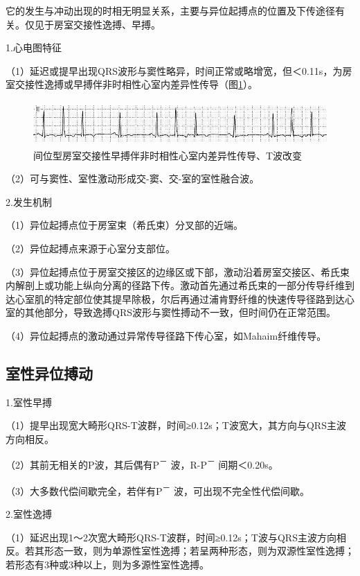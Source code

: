 它的发生与冲动出现的时相无明显关系，主要与异位起搏点的位置及下传途径有关。仅见于房室交接性逸搏、早搏。

1.心电图特征

（1）延迟或提早出现QRS波形与窦性略异，时间正常或略增宽，但＜0.11s，为房室交接性逸搏或早搏伴非时相性心室内差异性传导（图\ref{fig3-16}）。

\begin{figure}[!htbp]
 \centering
 \includegraphics[width=5.58333in,height=0.66667in]{./images/Image00066.jpg}
 \captionsetup{justification=centering}
 \caption{间位型房室交接性早搏伴非时相性心室内差异性传导、T波改变}
 \label{fig3-16}
  \end{figure} 

（2）可与窦性、室性激动形成交-窦、交-室的室性融合波。

2.发生机制

（1）异位起搏点位于房室束（希氏束）分叉部的近端。

（2）异位起搏点来源于心室分支部位。

（3）异位起搏点位于房室交接区的边缘区或下部，激动沿着房室交接区、希氏束内解剖上或功能上纵向分离的径路下传。激动首先通过希氏束的一部分传导纤维到达心室肌的特定部位使其提早除极，尔后再通过浦肯野纤维的快速传导径路到达心室的其他部分，导致逸搏QRS波形与窦性搏动不一致，但时间仍在正常范围。

（4）异位起搏点的激动通过异常传导径路下传心室，如Mahaim纤维传导。

\protect\hypertarget{text00009.htmlux5cux23subid60}{}{}

\subsection{室性异位搏动}

1.室性早搏

（1）提早出现宽大畸形QRS-T波群，时间≥0.12s；T波宽大，其方向与QRS主波方向相反。

（2）其前无相关的P波，其后偶有P\textsuperscript{－}
波，R-P\textsuperscript{－} 间期＜0.20s。

（3）大多数代偿间歇完全，若伴有P\textsuperscript{－}
波，可出现不完全性代偿间歇。

2.室性逸搏

（1）延迟出现1～2次宽大畸形QRS-T波群，时间≥0.12s；T波与QRS主波方向相反。若其形态一致，则为单源性室性逸搏；若呈两种形态，则为双源性室性逸搏；若形态有3种或3种以上，则为多源性室性逸搏。

